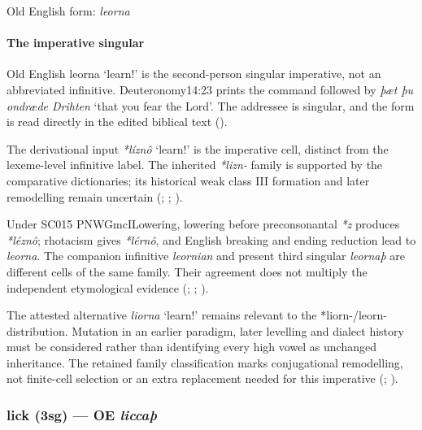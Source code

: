 \documentclass[
  british,
  a4paper,
]{article}
\providecommand{\Recon}[1]{\emph{*#1}}
\begin{document}
Old English form: \emph{leorna}

\paragraph{The imperative singular}\label{the-imperative-singular}

Old English {leorna} `learn!' is the second-person singular imperative,
not an abbreviated infinitive. Deuteronomy14:23 prints the command
followed by \emph{þæt þu ondræde Drihten} `that you fear the Lord'. The
addressee is singular, and the form is read directly in the edited
biblical text ().

The derivational input \Recon{líznô} `learn!' is the imperative cell,
distinct from the lexeme-level infinitive label. The inherited
\emph{*lizn-} family is supported by the comparative dictionaries; its
historical weak class III formation and later remodelling remain
uncertain (;
;
).

Under SC015 PNWGmcILowering, lowering before preconsonantal \emph{*z}
produces \emph{*léznô}; rhotacism gives \emph{*lérnô}, and English
breaking and ending reduction lead to \emph{leorna}. The companion
infinitive \emph{leornian} and present third singular \emph{leornaþ} are
different cells of the same family. Their agreement does not multiply
the independent etymological evidence (; ;
).

The attested alternative \emph{liorna} `learn!' remains relevant to the
*liorn-/leorn- distribution. Mutation in an earlier paradigm, later
levelling and dialect history must be considered rather than identifying
every high vowel as unchanged inheritance. The retained family
classification marks conjugational remodelling, not finite-cell
selection or an extra replacement needed for this imperative
(;
).

\subsubsection{\texorpdfstring{lick (3sg) --- OE
\emph{liccaþ}}{lick (3sg) --- OE liccaþ}}\label{lick-3sg-oe-liccauxfe}
\end{document}
